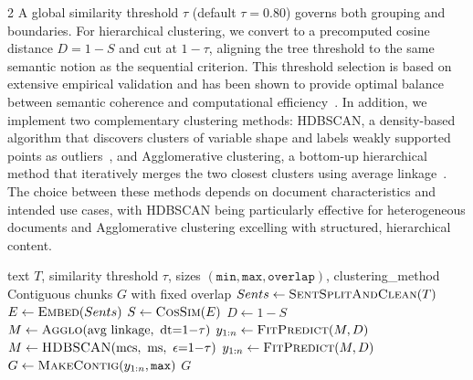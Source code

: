 \documentclass[10pt,letterpaper]{article}
\let\cite\citep
\begin{document}
\begin{multicols}{2}
A global similarity threshold $\tau$ (default $\tau=0.80$) governs both grouping and boundaries. For hierarchical clustering, we convert to a precomputed cosine distance $D=1-S$ and cut at $1-\tau$, aligning the tree threshold to the same semantic notion as the sequential criterion. This threshold selection is based on extensive empirical validation and has been shown to provide optimal balance between semantic coherence and computational efficiency~\cite{mcinnes2017hdbscan,ward1963hierarchical}. In addition, we implement two complementary clustering methods: HDBSCAN, a density-based algorithm that discovers clusters of variable shape and labels weakly supported points as outliers~\cite{mcinnes2017hdbscan}, and Agglomerative clustering, a bottom-up hierarchical method that iteratively merges the two closest clusters using average linkage~\cite{ward1963hierarchical}. The choice between these methods depends on document characteristics and intended use cases, with HDBSCAN being particularly effective for heterogeneous documents and Agglomerative clustering excelling with structured, hierarchical content.

\vspace{0.5em}
\begin{algorithm}[H]
\caption{Semantic Cluster Chunking}\label{alg:cfg_chunk}
\footnotesize
\begin{algorithmic}[1]
\Require text $T$, similarity threshold $\tau$, sizes $(\texttt{min},\texttt{max},\texttt{overlap})$, clustering\_method
\Ensure Contiguous chunks $G$ with fixed overlap
\State $Sents \gets \Call{SentSplitAndClean}{T}$ 
\State $E \gets \Call{Embed}{Sents}$ 
\State $S \gets \Call{CosSim}{E}$ 
\State $D \gets 1{-}S$ 
  \State $M \gets \Call{Agglo}{\text{avg linkage},\ \text{dt}{=}1{-}\tau}$
  \State $y_{1:n}\gets \Call{FitPredict}{M, D}$
\Else
  \State $M \gets \Call{HDBSCAN}{\text{mcs},\ \text{ms},\ \epsilon{=}1{-}\tau}$
  \State $y_{1:n}\gets \Call{FitPredict}{M, D}$ 
  \State {}
\EndIf
\State $G \gets \Call{MakeContig}{y_{1:n}, \texttt{max}}$ 
\State {} 
\State {} 
\State \Return $G$
\end{algorithmic}
\end{algorithm}


\end{multicols}
\end{document}

